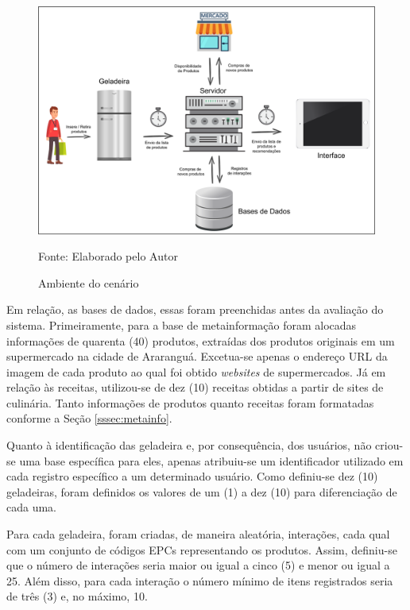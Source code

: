 \begin{figure}[htb]
    \caption{Ambiente do cenário}
    \label{fig:cap5_ambiente-cenario}
    \includegraphics[width=\textwidth]{figuras/cap5_cenario.png}
    
    \footnotesize{Fonte: Elaborado pelo Autor}
\end{figure}

Em relação, as bases de dados, essas foram preenchidas antes da avaliação do sistema. 
Primeiramente, para a base de metainformação foram alocadas informações de quarenta (40) produtos, extraídas dos produtos originais em um supermercado na cidade de Araranguá. Excetua-se apenas o endereço URL da imagem de cada produto ao qual foi obtido \textit{websites} de supermercados. 
Já em relação às receitas, utilizou-se de dez (10) receitas obtidas a partir de sites de culinária. Tanto informações  de produtos quanto receitas foram formatadas conforme a Seção \ref{sssec:metainfo}.

Quanto à identificação das geladeira e, por consequência, dos usuários, não criou-se uma base específica para eles, apenas atribuiu-se um identificador utilizado em cada registro específico a um determinado usuário. Como definiu-se dez (10) geladeiras, foram definidos os valores de um (1) a dez (10) para diferenciação de cada uma.

Para cada geladeira, foram criadas, de maneira aleatória, interações, cada qual com um conjunto de códigos EPCs representando os produtos. Assim, definiu-se que o número de interações seria maior ou igual a cinco (5) e menor ou igual a 25. Além disso, para cada interação o número mínimo de itens registrados seria de três (3) e, no máximo, 10.

